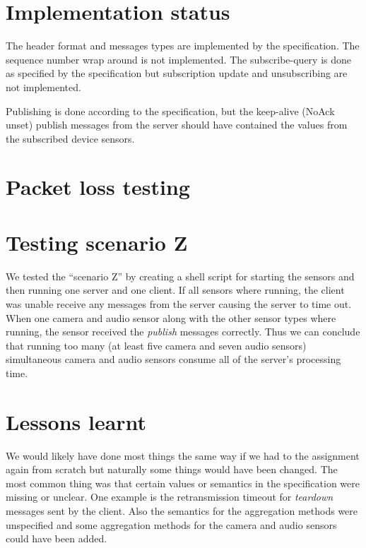 \documentclass[a4paper]{article}
\begin{document}


\tableofcontents
\newpage

\section{Implementation status}
The header format and messages types are implemented by the specification.
The sequence number wrap around is not implemented. The subscribe-query is done
as specified by the specification but subscription update and unsubscribing
are not implemented.

Publishing is done according to the specification, but the keep-alive (NoAck
unset) publish messages from the server should have contained the values from
the subscribed device sensors.




\section{Packet loss testing}

\section{Testing scenario Z}
We tested the ``scenario Z'' by creating a shell script
for starting the sensors and then running one server and one client. If all
sensors where running, the client was unable receive any messages from the
server causing the server to time out. When one camera and audio sensor along
with the other sensor types where running, the sensor received the \emph{publish}
messages correctly. Thus we can conclude that running too many (at least five
camera and seven audio sensors) simultaneous camera and audio sensors consume
all of the server's processing time.

\section{Lessons learnt}
We would likely have done most things the same way if we had to the assignment
again from scratch but naturally some things would have been changed. The most
common thing was that certain values or semantics in the specification were
missing or unclear. One example is the retransmission timeout for \emph{teardown}
messages sent by the client. Also the semantics for the aggregation methods
were unspecified and some aggregation methods for the camera and audio sensors
could have been added. 
\end{document}
